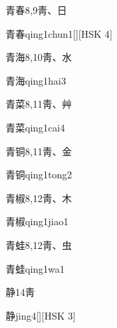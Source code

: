 \begin{Entry}{青春}{8,9}{⾭、⽇}
  \begin{Phonetics}{青春}{qing1chun1}[][HSK 4]
  \end{Phonetics}
\end{Entry}

\begin{Entry}{青海}{8,10}{⾭、⽔}
  \begin{Phonetics}{青海}{qing1hai3}
  \end{Phonetics}
\end{Entry}

\begin{Entry}{青菜}{8,11}{⾭、⾋}
  \begin{Phonetics}{青菜}{qing1cai4}
  \end{Phonetics}
\end{Entry}

\begin{Entry}{青铜}{8,11}{⾭、⾦}
  \begin{Phonetics}{青铜}{qing1tong2}
  \end{Phonetics}
\end{Entry}

\begin{Entry}{青椒}{8,12}{⾭、⽊}
  \begin{Phonetics}{青椒}{qing1jiao1}
  \end{Phonetics}
\end{Entry}

\begin{Entry}{青蛙}{8,12}{⾭、⾍}
  \begin{Phonetics}{青蛙}{qing1wa1}
  \end{Phonetics}
\end{Entry}

\begin{Entry}{静}{14}{⾭}
  \begin{Phonetics}{静}{jing4}[][HSK 3]
  \end{Phonetics}
\end{Entry}


